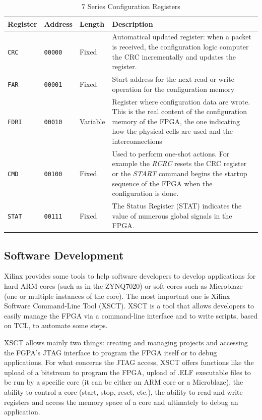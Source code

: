 \begin{table}[H]
\centering
    \begin{tabular}{p{2cm}|p{2cm}|p{1.5cm}|p{7cm}}
        \textbf{Register} & \textbf{Address} & \textbf{Length} & \textbf{Description} \\
        \hline
        \texttt{CRC} & \texttt{00000} & Fixed & Automatical updated register: when a packet is received, the configuration logic computer the CRC incrementally and updates the register. \\
        \hline
        \texttt{FAR} & \texttt{00001} & Fixed & Start address for the next read or write operation for the configuration memory\\
        \hline
        \texttt{FDRI} & \texttt{00010} & Variable & Register where configuration data are wrote. This is the real content of the configuration memory of the FPGA, the one indicating how the physical cells are used and the interconnections\\
        \hline
        \texttt{CMD} & \texttt{00100} & Fixed & Used to perform one-shot actions. For example the \textit{RCRC} resets the CRC register or the \textit{START} command begins the startup sequence of the FPGA when the configuration is done.\\
        \texttt{STAT} & \texttt{00111} & Fixed & The Status Register (STAT) indicates the value of numerous global signals in the FPGA.\\
    \end{tabular}
\caption{7 Series Configuration Registers}
\label{tab:conf_regs}
\end{table}


\subsection{Software Development}

Xilinx provides some tools to help software developers to develop applications for hard ARM cores (such as in the ZYNQ7020) or soft-cores such as Microblaze (one or multiple instances of the core). The most important one is Xilinx Software Command-Line Tool (XSCT). XSCT is a tool that allows developers to easily manage the FPGA via a command-line interface and to write scripts, based on TCL, to automate some steps. \bigskip

XSCT allows mainly two things: creating and managing projects and accessing the FGPA's JTAG interface to program the FPGA itself or to debug applications. For what concerns the JTAG access, XSCT offers functions like the upload of a bitstream to program the FPGA, upload of .ELF executable files to be run by a specific core (it can be either an ARM core or a Microblaze), the ability to control a core (start, stop, reset, etc.), the ability to read and write registers and access the memory space of a core and ultimately to debug an application. \bigskip

